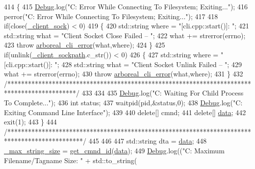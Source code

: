 \begin{DoxyCode}
414     \{
415       \mbox{\hyperlink{_cli_8h_ab6d95a4e6a59b4ad033ed3af31d878e0}{Debug}}.log(\textcolor{stringliteral}{"C: Error While Connecting To Filesystem; Exiting..."});
416       perror(\textcolor{stringliteral}{"C: Error While Connecting To Filesystem; Exiting..."});
417 
418       \textcolor{keywordflow}{if}(close(\mbox{\hyperlink{class_c_l_i_a89c215687bff66a3e0359a17bac3657d}{\_client\_sock}}) < 0)
419       \{
420         std::string where = \textcolor{stringliteral}{"[cli.cpp::start()]: "};
421         std::string what = \textcolor{stringliteral}{"Client Socket Close Failed -- "};
422         what += strerror(errno);
423         \textcolor{keywordflow}{throw} \mbox{\hyperlink{classarboreal__cli__error}{arboreal\_cli\_error}}(what,where);
424       \}
425       \textcolor{keywordflow}{if}(unlink(\mbox{\hyperlink{class_c_l_i_ad3b7579608f8c2e1d4c01a8668f701d9}{\_client\_sockpath}}.c\_str()) < 0)
426       \{
427         std::string where = \textcolor{stringliteral}{"[cli.cpp::start()]: "};
428         std::string what = \textcolor{stringliteral}{"Client Socket Unlink Failed -- "};
429         what += strerror(errno);
430         \textcolor{keywordflow}{throw} \mbox{\hyperlink{classarboreal__cli__error}{arboreal\_cli\_error}}(what,where);
431       \}
432       \textcolor{comment}{/********************************************************************************************/}
433 
434 
435       \mbox{\hyperlink{_cli_8h_ab6d95a4e6a59b4ad033ed3af31d878e0}{Debug}}.log(\textcolor{stringliteral}{"C: Waiting For Child Process To Complete..."});
436       \textcolor{keywordtype}{int} status;
437       waitpid(pid,&status,0);
438       \mbox{\hyperlink{_cli_8h_ab6d95a4e6a59b4ad033ed3af31d878e0}{Debug}}.log(\textcolor{stringliteral}{"C: Exiting Command Line Interface"});
439 
440       \textcolor{keyword}{delete}[] cmnd;
441       \textcolor{keyword}{delete}[] \mbox{\hyperlink{daemon_8h_a85eb9d2878279de5fcb3000467c81af7}{data}};
442       exit(1);
443     \}
444     \textcolor{comment}{/**********************************************************************************************/}
445 
446 
447     std::string dta = \mbox{\hyperlink{daemon_8h_a85eb9d2878279de5fcb3000467c81af7}{data}};
448     \mbox{\hyperlink{class_c_l_i_a13b5699d950ce765cad098f7613a3e20}{\_max\_string\_size}} = \mbox{\hyperlink{cli__helper_8hpp_a9caf20ba13e1adbc3e58c175a9b11fc0}{get\_cmnd\_id}}(\mbox{\hyperlink{daemon_8h_a85eb9d2878279de5fcb3000467c81af7}{data}});
449     \mbox{\hyperlink{_cli_8h_ab6d95a4e6a59b4ad033ed3af31d878e0}{Debug}}.log((\textcolor{stringliteral}{"C: Maximum Filename/Tagname Size: "} + std::to\_string(

\end{DoxyCode}
